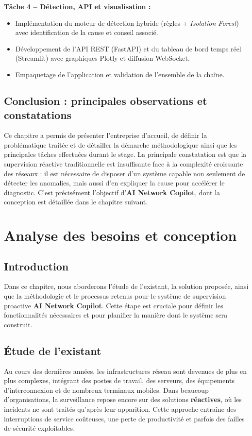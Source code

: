 \documentclass[12pt,a4paper]{report}
\begin{document}
\noindent\textbf{Tâche 4 -- Détection, API et visualisation :}
\begin{itemize}[leftmargin=*,nosep]
\item Implémentation du moteur de détection hybride (règles + \textit{Isolation
Forest}) avec identification de la cause et conseil associé.
\item Développement de l'API REST (FastAPI) et du tableau de bord temps réel
(Streamlit) avec graphiques Plotly et diffusion WebSocket.
\item Empaquetage de l'application et validation de l'ensemble de la chaîne.
\end{itemize}

\section{Conclusion : principales observations et constatations}
Ce chapitre a permis de présenter l'entreprise d'accueil, de définir la
problématique traitée et de détailler la démarche méthodologique ainsi que les
principales tâches effectuées durant le stage. La principale constatation est que
la supervision réactive traditionnelle est insuffisante face à la complexité
croissante des réseaux : il est nécessaire de disposer d'un système capable non
seulement de détecter les anomalies, mais aussi d'en expliquer la cause pour
accélérer le diagnostic. C'est précisément l'objectif d'\textbf{AI Network
Copilot}, dont la conception est détaillée dans le chapitre suivant.

\chapter{Analyse des besoins et conception}

\section{Introduction}
Dans ce chapitre, nous aborderons l'étude de l'existant, la solution proposée,
ainsi que la méthodologie et le processus retenus pour le système de supervision
proactive \textbf{AI Network Copilot}. Cette étape est cruciale pour définir les
fonctionnalités nécessaires et pour planifier la manière dont le système sera
construit.

\section{Étude de l'existant}
Au cours des dernières années, les infrastructures réseau sont devenues de plus en
plus complexes, intégrant des postes de travail, des serveurs, des équipements
d'interconnexion et de nombreux terminaux mobiles. Dans beaucoup d'organisations,
la surveillance repose encore sur des solutions \textbf{réactives}, où les
incidents ne sont traités qu'après leur apparition. Cette approche entraîne des
interruptions de service coûteuses, une perte de productivité et parfois des
failles de sécurité exploitables.
\end{document}

